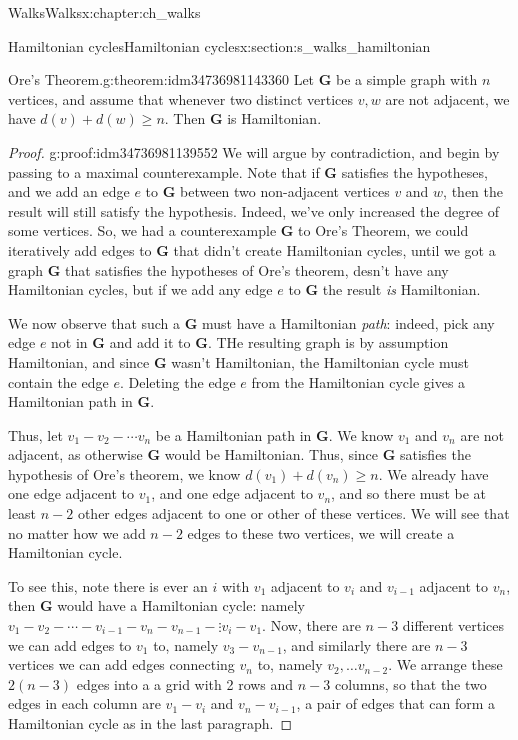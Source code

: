 \documentclass[oneside,10pt,]{book}
\numberwithin{equation}{section}
\newcommand{\bfG}{\mathbf{G}}
\begin{document}
\begin{chapterptx}{Walks}{}{Walks}{}{}{x:chapter:ch_walks}
\begin{sectionptx}{Hamiltonian cycles}{}{Hamiltonian cycles}{}{}{x:section:s_walks_hamiltonian}
\begin{theorem}{Ore's Theorem.}{}{g:theorem:idm34736981143360}%
Let \(\bfG\) be a simple graph with \(n\) vertices, and assume that whenever two distinct vertices \(v,w\) are not adjacent, we have \(d(v)+d(w)\geq n\).  Then \(\bfG\) is Hamiltonian.%
\end{theorem}
\begin{proof}{}{g:proof:idm34736981139552}
We will argue by contradiction, and begin by passing to a maximal counterexample.  Note that if \(\bfG\) satisfies the hypotheses, and we add an edge \(e\) to \(\bfG\) between two non-adjacent vertices \(v\) and \(w\), then the result will still satisfy the hypothesis.  Indeed, we've only increased the degree of some vertices.  So, we had a counterexample \(\bfG\) to Ore's Theorem, we could iteratively add edges to \(\bfG\) that didn't create Hamiltonian cycles, until we got a graph \(\bfG\) that satisfies the hypotheses of Ore's theorem, desn't have any Hamiltonian cycles, but if we add any edge \(e\) to \(\bfG\) the result \emph{is} Hamiltonian.%
\par
We now observe that such a \(\bfG\) must have a Hamiltonian \emph{path}: indeed, pick any edge \(e\) not in \(\bfG\) and add it to \(\bfG\).  THe resulting graph is by assumption Hamiltonian, and since \(\bfG\) wasn't Hamiltonian, the Hamiltonian cycle must contain the edge \(e\).  Deleting the edge \(e\) from the Hamiltonian cycle gives a Hamiltonian path in \(\bfG\).%
\par
Thus, let \(v_1-v_2-\cdots v_n\) be a Hamiltonian path in \(\bfG\).  We know \(v_1\) and \(v_n\) are not adjacent, as otherwise \(\bfG\) would be Hamiltonian.  Thus, since \(\bfG\) satisfies the hypothesis of Ore's theorem,  we know \(d(v_1)+d(v_n)\geq n\).  We already have one edge adjacent to \(v_1\), and one edge adjacent to \(v_n\), and so there must be at least \(n-2\) other edges adjacent to one or other of these vertices.  We will see that no matter how we add \(n-2\) edges to these two vertices, we will create a Hamiltonian cycle.%
\par
To see this, note there is ever an \(i\) with \(v_1\) adjacent to \(v_i\) and \(v_{i-1}\) adjacent to \(v_n\), then \(\bfG\) would have a Hamiltonian cycle: namely \(v_1-v_2-\cdots-v_{i-1}-v_n-v_{n-1}-\vdots v_i-v_1\).  Now, there are \(n-3\) different vertices we can add edges to \(v_1\) to, namely \(v_3-v_{n-1}\), and similarly there are \(n-3\) vertices we can add edges connecting \(v_n\) to, namely \(v_2, \dots v_{n-2}\).  We arrange these \(2(n-3)\) edges into a a grid with 2 rows and \(n-3\) columns, so that the two edges in each column are \(v_1-v_i\) and \(v_n-v_{i-1}\), a pair of edges that can form a Hamiltonian cycle as in the last paragraph.%

\end{proof}
\end{sectionptx}
\end{chapterptx}
\end{document}
